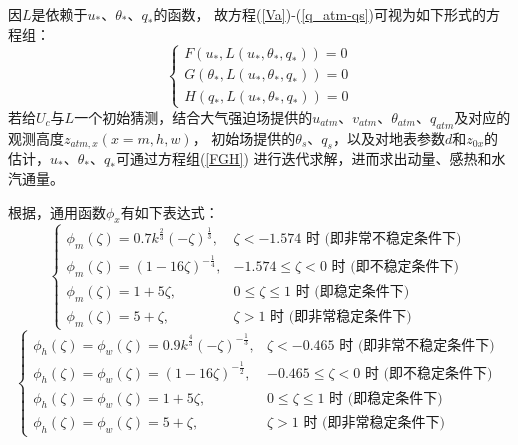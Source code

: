 因$L$是依赖于$u_\ast$、$\theta_\ast$、$q_\ast$的函数，
故方程(\ref{Va})-(\ref{q_atm-qs})可视为如下形式的方程组：
\begin{equation}\label{FGH}
\left\{\begin{array}{l}F\left(u_{*}, L\left(u_{*}, \theta_{*}, q_{*}\right)\right)=0 \\
      G\left(\theta_{*}, L\left(u_{*}, \theta_{*}, q_{*}\right)\right)=0 \\ 
      H\left(q_{*}, L\left(u_{*}, \theta_{*}, q_{*}\right)\right)=0\end{array}\right.
\end{equation}
若给$U_c$与$L$一个初始猜测，结合大气强迫场提供的$u_{atm}$、$v_{atm}$、$\theta_{atm}$、$q_{atm}$及对应的观测高度$z_{atm,x}(x=m,h,w)$，
初始场提供的$\theta_s$、$q_s$，以及对地表参数$d$和$z_{0x}$的估计，$u_\ast$、$\theta_\ast$、$q_\ast$可通过方程组(\ref{FGH})
进行迭代求解，进而求出动量、感热和水汽通量。

根据\citet{zeng1998intercomparison}，通用函数$\phi_x$有如下表达式：
\begin{equation}\label{phim_zeng}
\left\{\begin{array}{lr}\phi_{m}(\zeta)=0.7 k^{\frac{2}{3}}(-\zeta)^{\frac{1}{3}}, & \zeta<-1.574 \text { 时 (即非常不稳定条件下) } \\
      \phi_{m}(\zeta)=(1-16 \zeta)^{-\frac{1}{4}}, & -1.574 \leq \zeta<0 \text { 时 (即不稳定条件下) } \\
       \phi_{m}(\zeta)=1+5 \zeta, & 0 \leq \zeta \leq 1 \text { 时 (即稳定条件下) } \\ 
       \phi_{m}(\zeta)=5+\zeta, & \zeta>1 \text { 时 (即非常稳定条件下) }\end{array}\right.
\end{equation}
\begin{equation}
\left\{\begin{array}{lr}\phi_{h}(\zeta)=\phi_{w}(\zeta)=0.9 k^{\frac{4}{3}}(-\zeta)^{-\frac{1}{3}}, & \zeta<-0.465 \text { 时 (即非常不稳定条件下) } \\ 
     \phi_{h}(\zeta)=\phi_{w}(\zeta)=(1-16 \zeta)^{-\frac{1}{2}}, & -0.465 \leq \zeta<0 \text { 时 (即不稳定条件下) } \\ 
     \phi_{h}(\zeta)=\phi_{w}(\zeta)=1+5 \zeta, & 0 \leq \zeta \leq 1 \text { 时 (即稳定条件下) } \\
      \phi_{h}(\zeta)=\phi_{w}(\zeta)=5+\zeta, & \zeta>1 \text { 时 (即非常稳定条件下) }\end{array}\right.
\end{equation}

